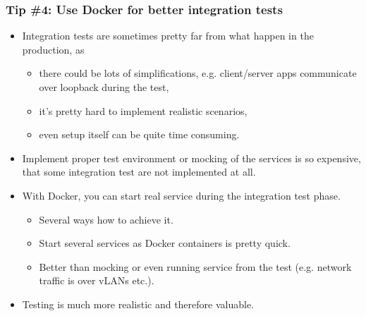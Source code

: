 \documentclass[10pt,utf8]{beamer}
\begin{document}
\begin{frame}
	\frametitle{Tip \#4: Use Docker for better integration tests}
	\begin{itemize}
		\item Integration tests are sometimes pretty far from what happen in the production, as 
		\begin{itemize}
			\item there could be lots of simplifications, e.g. client/server apps communicate over loopback during the test,
			\item it's pretty hard to implement realistic scenarios,
			\item even setup itself can be quite time consuming.
		\end{itemize}
		\item Implement proper test environment or mocking of the services is so expensive, that some integration test are not implemented at all.
	\end{itemize}
	
	\vspace{0.7cm}
	
	\begin{itemize}
		\item With Docker, you can start real service during the integration test phase.
		\begin{itemize}
			\item Several ways how to achieve it.
			\item Start several services as Docker containers is pretty quick.
			\item Better than mocking or even running service from the test (e.g. network traffic is over vLANs etc.).
		\end{itemize}
		\item Testing is much more realistic and therefore valuable.
	\end{itemize}
\end{frame}
\end{document}
